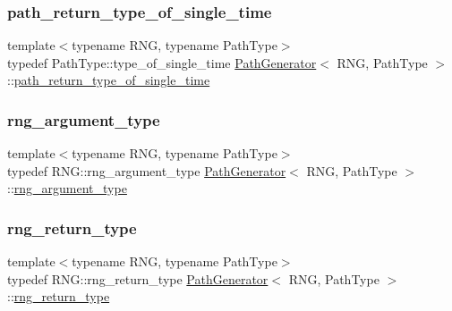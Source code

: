\subsubsection{\texorpdfstring{path\+\_\+return\+\_\+type\+\_\+of\+\_\+single\+\_\+time}{path\_return\_type\_of\_single\_time}}
{\footnotesize\ttfamily template$<$typename R\+NG, typename Path\+Type$>$ \\
typedef Path\+Type\+::type\+\_\+of\+\_\+single\+\_\+time \hyperlink{class_path_generator}{Path\+Generator}$<$ R\+NG, Path\+Type $>$\+::\hyperlink{class_path_generator_a467bc3ddaa5e9104170550617e767349}{path\+\_\+return\+\_\+type\+\_\+of\+\_\+single\+\_\+time}}

\hypertarget{class_path_generator_a2f6a701b324534da9f05ccc11c320e6b}{}\label{class_path_generator_a2f6a701b324534da9f05ccc11c320e6b} 
\subsubsection{\texorpdfstring{rng\+\_\+argument\+\_\+type}{rng\_argument\_type}}
{\footnotesize\ttfamily template$<$typename R\+NG, typename Path\+Type$>$ \\
typedef R\+N\+G\+::rng\+\_\+argument\+\_\+type \hyperlink{class_path_generator}{Path\+Generator}$<$ R\+NG, Path\+Type $>$\+::\hyperlink{class_path_generator_a2f6a701b324534da9f05ccc11c320e6b}{rng\+\_\+argument\+\_\+type}}

\hypertarget{class_path_generator_aa97ab7e55299daa0f38539816f171369}{}\label{class_path_generator_aa97ab7e55299daa0f38539816f171369} 
\subsubsection{\texorpdfstring{rng\+\_\+return\+\_\+type}{rng\_return\_type}}
{\footnotesize\ttfamily template$<$typename R\+NG, typename Path\+Type$>$ \\
typedef R\+N\+G\+::rng\+\_\+return\+\_\+type \hyperlink{class_path_generator}{Path\+Generator}$<$ R\+NG, Path\+Type $>$\+::\hyperlink{class_path_generator_aa97ab7e55299daa0f38539816f171369}{rng\+\_\+return\+\_\+type}}

